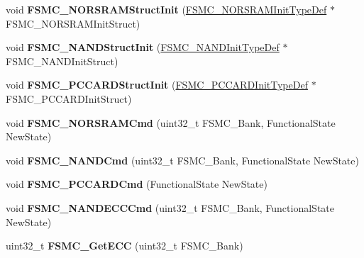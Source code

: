 \begin{DoxyCompactItemize}
\item 
\hypertarget{group__FSMC__Exported__Functions_gaf33e6dfc34f62d16a0cb416de9e83d28}{
void {\bfseries FSMC\_\-NORSRAMStructInit} (\hyperlink{structFSMC__NORSRAMInitTypeDef}{FSMC\_\-NORSRAMInitTypeDef} $\ast$FSMC\_\-NORSRAMInitStruct)}
\label{group__FSMC__Exported__Functions_gaf33e6dfc34f62d16a0cb416de9e83d28}

\item 
\hypertarget{group__FSMC__Exported__Functions_ga8283ad94ad8e83d49d5b77d1c7e17862}{
void {\bfseries FSMC\_\-NANDStructInit} (\hyperlink{structFSMC__NANDInitTypeDef}{FSMC\_\-NANDInitTypeDef} $\ast$FSMC\_\-NANDInitStruct)}
\label{group__FSMC__Exported__Functions_ga8283ad94ad8e83d49d5b77d1c7e17862}

\item 
\hypertarget{group__FSMC__Exported__Functions_ga7a64ba0e0545b3f1913c9d1d28c05e62}{
void {\bfseries FSMC\_\-PCCARDStructInit} (\hyperlink{structFSMC__PCCARDInitTypeDef}{FSMC\_\-PCCARDInitTypeDef} $\ast$FSMC\_\-PCCARDInitStruct)}
\label{group__FSMC__Exported__Functions_ga7a64ba0e0545b3f1913c9d1d28c05e62}

\item 
\hypertarget{group__FSMC__Exported__Functions_gaf943f0f2680168d3a95a3c2c9f3eca2a}{
void {\bfseries FSMC\_\-NORSRAMCmd} (uint32\_\-t FSMC\_\-Bank, FunctionalState NewState)}
\label{group__FSMC__Exported__Functions_gaf943f0f2680168d3a95a3c2c9f3eca2a}

\item 
\hypertarget{group__FSMC__Exported__Functions_ga33ec7c39ea4d42e92c72c6e517d8235c}{
void {\bfseries FSMC\_\-NANDCmd} (uint32\_\-t FSMC\_\-Bank, FunctionalState NewState)}
\label{group__FSMC__Exported__Functions_ga33ec7c39ea4d42e92c72c6e517d8235c}

\item 
\hypertarget{group__FSMC__Exported__Functions_ga2d410151ceb3428c6a1bf374a0472cde}{
void {\bfseries FSMC\_\-PCCARDCmd} (FunctionalState NewState)}
\label{group__FSMC__Exported__Functions_ga2d410151ceb3428c6a1bf374a0472cde}

\item 
\hypertarget{group__FSMC__Exported__Functions_ga5800301fc39bbe998a18ebd9ff191cdc}{
void {\bfseries FSMC\_\-NANDECCCmd} (uint32\_\-t FSMC\_\-Bank, FunctionalState NewState)}
\label{group__FSMC__Exported__Functions_ga5800301fc39bbe998a18ebd9ff191cdc}

\item 
\hypertarget{group__FSMC__Exported__Functions_gaad6d4f5b5a41684ce053fea55bdb98d8}{
uint32\_\-t {\bfseries FSMC\_\-GetECC} (uint32\_\-t FSMC\_\-Bank)}
\label{group__FSMC__Exported__Functions_gaad6d4f5b5a41684ce053fea55bdb98d8}


\end{DoxyCompactItemize}
